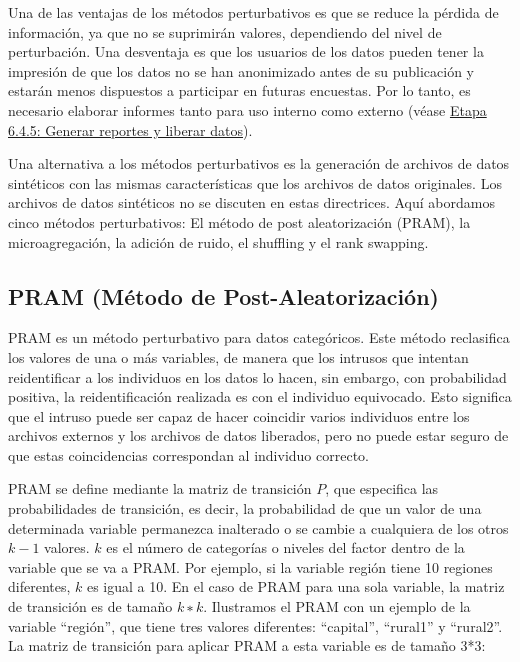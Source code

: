 \documentclass[
]{book}
\theoremstyle{definition}
\theoremstyle{definition}
\theoremstyle{definition}
\theoremstyle{definition}
\theoremstyle{remark}
\begin{document}
Una de las ventajas de los métodos perturbativos es que se reduce la pérdida de información, ya que no se suprimirán valores, dependiendo del nivel de perturbación. Una desventaja es que los usuarios de los datos pueden tener la impresión de que los datos no se han anonimizado antes de su publicación y estarán menos dispuestos a participar en futuras encuestas. Por lo tanto, es necesario elaborar informes tanto para uso interno como externo (véase \protect\hyperlink{etapa-6.4.5-generar-reportes-y-liberar-datos}{Etapa 6.4.5: Generar reportes y liberar datos}).

Una alternativa a los métodos perturbativos es la generación de archivos de datos sintéticos con las mismas características que los archivos de datos originales. Los archivos de datos sintéticos no se discuten en estas directrices. Aquí abordamos cinco métodos perturbativos: El método de post aleatorización (PRAM), la microagregación, la adición de ruido, el shuffling y el rank swapping.

\hypertarget{pram-muxe9todo-de-post-aleatorizaciuxf3n}{%
\subsection{PRAM (Método de Post-Aleatorización)}\label{pram-muxe9todo-de-post-aleatorizaciuxf3n}}

PRAM es un método perturbativo para datos categóricos. Este método reclasifica los valores de una o más variables, de manera que los intrusos que intentan reidentificar a los individuos en los datos lo hacen, sin embargo, con probabilidad positiva, la reidentificación realizada es con el individuo equivocado. Esto significa que el intruso puede ser capaz de hacer coincidir varios individuos entre los archivos externos y los archivos de datos liberados, pero no puede estar seguro de que estas coincidencias correspondan al individuo correcto.

PRAM se define mediante la matriz de transición \(P\), que especifica las probabilidades de transición, es decir, la probabilidad de que un valor de una determinada variable permanezca inalterado o se cambie a cualquiera de los otros \(k-1\) valores. \(k\) es el número de categorías o niveles del factor dentro de la variable que se va a PRAM. Por ejemplo, si la variable región tiene 10 regiones diferentes, \(k\) es igual a 10. En el caso de PRAM para una sola variable, la matriz de transición es de tamaño \(k∗k\). Ilustramos el PRAM con un ejemplo de la variable ``región'', que tiene tres valores diferentes: ``capital'', ``rural1'' y ``rural2''. La matriz de transición para aplicar PRAM a esta variable es de tamaño 3*3:
\end{document}
